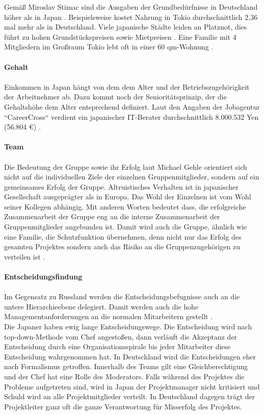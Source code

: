 		Gemäß Miroslav Stimac sind die Ausgaben der Grundbedürfnisse in Deutschland höher als in Japan \cite[101]{Stimac2004}.
		Beispielsweise kostet Nahrung in Tokio durchschnittlich 2,36 mal mehr als in Deutschland. Viele japanische Städte leiden an Platznot, dies führt zu hohen Grundstückspreisen sowie Mietpreisen \cite[105]{Stimac2004}.
		Eine Familie mit 4 Mitgliedern im Großraum Tokio lebt oft in einer 60 qm-Wohnung \cite{ArbZeitJP}.\\	\\
		\textbf{Gehalt}\\ \\
		Einkommen in Japan hängt von dem dem Alter und der Betriebszugehörigkeit
		der Arbeitnehmer ab. Dazu kommt noch der Senioritätsprinzip, der die Gehaltshöhe dem Alter entsprechend definiert. Laut den Angaben der Jobagentur ``CareerCross`` verdient ein japanischer IT-Berater durchschnittlich 8.000.532 Yen (56.804 €) \cite{GehaltJapan}.
		 \\ \\
			\textbf{Team}\\
			\\
		Die Bedeutung der Gruppe sowie ihr Erfolg laut Michael Gehle orientiert sich nicht auf die individuellen Ziele der	einzelnen Gruppenmitglieder, sondern auf ein gemeinsames Erfolg der Gruppe. Altruistisches Verhalten ist in japanischer Gesellschaft ausgeprägter als in Europa. Das Wohl der Einzelnen ist vom Wohl seiner Kollegen abhängig. Mit anderen Worten bedeutet dass, die erfolgreiche Zusammenarbeit der Gruppe eng an die interne Zusammenarbeit der Gruppenmitglieder angebunden  ist. Damit wird auch die Gruppe,  ähnlich wie eine Familie, die Schutzfunktion übernehmen, denn nicht nur das Erfolg des gesamten Projektes sondern auch das Risiko an die Gruppenzugehörigen zu verteilen ist \cite[233]{3LaenderVergl}.\\ \\
		\textbf{Entscheidungsfindung} \\ \\
		Im Gegensatz zu Russland werden die Entscheidungsbefugnisse auch an die untere Hierarchieebene delegiert. Damit werden auch die hohe Managementanforderungen  an die normalen Mitarbeitern gestellt \cite[233]{3LaenderVergl}.\\
		Die Japaner haben ewig lange Entscheidungswege. Die Entscheidung wird nach top-down-Methode vom Chef angestoßen, dann verläuft die Akzeptanz der Entscheidung durch eine Organisationsspirale bis jeder Mitarbeiter diese Entscheidung wahrgenommen hat. In Deutschland wird die Entscheidungen eher nach Formalismus getroffen. Innerhalb des Teams gilt eine Gleichberechtigung und der Chef hat eine Rolle des Moderators. Falls während des Projektes die Probleme aufgetreten sind, wird in Japan der Projektmanager nicht kritisiert und Schuld wird an alle Projektmitglieder verteilt. In Deutschland dagegen trägt der Projektleiter ganz oft die ganze Verantwortung für Misserfolg des Projektes.
